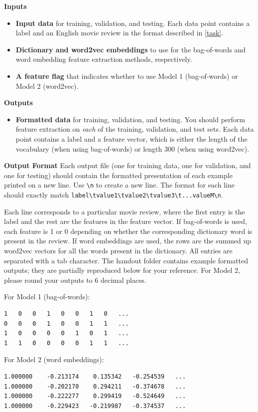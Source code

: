 \documentclass[11pt,addpoints,answers]{exam}
\begin{document}
{\bf Inputs }
\begin{itemize}
    \item \textbf{Input data} for training, validation, and testing. Each data point contains a label and an English movie review in the format described in \ref{task}.
    \item \textbf{Dictionary and word2vec embeddings} to use for the bag-of-words and word embedding feature extraction methods, respectively.
    \item \textbf{A feature flag} that indicates whether to use Model 1 (bag-of-words) or Model 2 (word2vec).
\end{itemize}

{\bf Outputs }
\begin{itemize}
    \item \textbf{Formatted data} for training, validation, and testing. You should perform feature extraction on \textit{each} of the training, validation, and test sets. Each data point contains a label and a feature vector, which is either the length of the vocabulary (when using bag-of-words) or length 300 (when using word2vec).
\end{itemize}

{\bf Output Format }
Each output file (one for training data, one for validation, and one for testing) should contain the formatted presentation of each example printed on a new line. Use \lstinline{\n} to create a new line. The format for each line should exactly match \lstinline{label\tvalue1\tvalue2\tvalue3\t...valueM\n}.

Each line corresponds to a particular movie review, where the first entry is the label and the rest are the features in the feature vector. If bag-of-words is used, each feature is 1 or 0 depending on whether the corresponding dictionary word is present in the review. If word embeddings are used, the rows are the summed up word2vec vectors for all the words present in the dictionary. All entries are separated with a tab character. The handout folder contains example formatted outputs; they are partially reproduced below for your reference. For Model 2, please round your outputs to 6 decimal places.

For Model 1 (bag-of-words):
\begin{lstlisting}
1	0	0	1	0	0	1	0	...
0	0	0	1	0	0	1	1	...
1	0	0	0	0	1	0	1	...
1	1	0	0	0	0	1	1	...
\end{lstlisting}

For Model 2 (word embeddings):
\begin{lstlisting}
1.000000	-0.213174	 0.135342	-0.254539	...
1.000000	-0.202170	 0.294211	-0.374678	...
1.000000	-0.222277	 0.299419	-0.524649	...
1.000000	-0.229423	-0.219987	-0.374537	...
\end{lstlisting}
\end{document}
